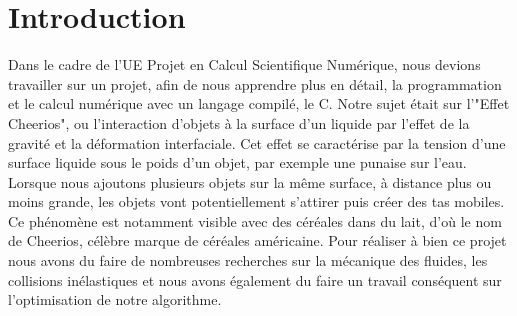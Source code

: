 \section*{Introduction}
    Dans le cadre de l'UE Projet en Calcul Scientifique Numérique, nous devions travailler sur un projet, afin de nous apprendre plus en détail, la programmation et le calcul numérique avec un langage compilé, le C. Notre sujet était sur l'"Effet Cheerios", ou l'interaction d'objets à la surface d'un liquide par l'effet de la gravité et la déformation interfaciale. Cet effet se caractérise par la tension d'une surface liquide sous le poids d'un objet, par exemple une punaise sur l'eau. Lorsque nous ajoutons plusieurs objets sur la même surface, à distance plus ou moins grande, les objets vont potentiellement s'attirer puis créer des tas mobiles. Ce phénomène est notamment visible avec des céréales dans du lait, d'où le nom de Cheerios, célèbre marque de céréales américaine. Pour réaliser à bien ce projet nous avons du faire de nombreuses recherches sur la mécanique des fluides, les collisions inélastiques et nous avons également du faire un travail conséquent sur l'optimisation de notre algorithme.